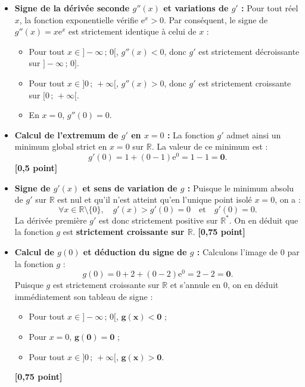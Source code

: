 \documentclass[11pt,a4paper]{article}
\newcommand{\R}{\mathbb{R}}
\newcommand{\e}{\mathrm{e}}
\begin{document}
\begin{correctionbox}
\begin{itemize}[leftmargin=*]
    \item \textbf{Signe de la dérivée seconde $g''(x)$ et variations de $g'$ :}
    Pour tout réel $x$, la fonction exponentielle vérifie $\e^x > 0$.
    Par conséquent, le signe de $g''(x) = x\e^x$ est strictement identique à celui de $x$ :
    \begin{itemize}
        \item Pour tout $x \in ]-\infty\,;\,0[$, $g''(x) < 0$, donc $g'$ est strictement décroissante sur $]-\infty\,;\,0]$.
        \item Pour tout $x \in ]0\,;\,+\infty[$, $g''(x) > 0$, donc $g'$ est strictement croissante sur $[0\,;\,+\infty[$.
        \item En $x = 0$, $g''(0) = 0$.
    \end{itemize}
    \item \textbf{Calcul de l'extremum de $g'$ en $x = 0$ :}
    La fonction $g'$ admet ainsi un minimum global strict en $x = 0$ sur $\R$. La valeur de ce minimum est :
    \[
    g'(0) = 1 + (0 - 1)\e^0 = 1 - 1 = \mathbf{0}.
    \] \hfill \textbf{[0{,}5 point]}
    \item \textbf{Signe de $g'(x)$ et sens de variation de $g$ :}
    Puisque le minimum absolu de $g'$ sur $\R$ est nul et qu'il n'est atteint qu'en l'unique point isolé $x = 0$, on a :
    \[
    \forall x \in \R \setminus \{0\}, \quad g'(x) > g'(0) = 0 \quad \text{et} \quad g'(0) = 0.
    \]
    La dérivée première $g'$ est donc strictement positive sur $\R^*$.
    On en déduit que la fonction $g$ est \textbf{strictement croissante sur $\R$}. \hfill \textbf{[0{,}75 point]}
    \item \textbf{Calcul de $g(0)$ et déduction du signe de $g$ :}
    Calculons l'image de $0$ par la fonction $g$ :
    \[
    g(0) = 0 + 2 + (0 - 2)\e^0 = 2 - 2 = \mathbf{0}.
    \]
    Puisque $g$ est strictement croissante sur $\R$ et s'annule en $0$, on en déduit immédiatement son tableau de signe :
    \begin{itemize}
        \item Pour tout $x \in ]-\infty\,;\,0[$, $\mathbf{g(x) < 0}$ ;
        \item Pour $x = 0$, $\mathbf{g(0) = 0}$ ;
        \item Pour tout $x \in ]0\,;\,+\infty[$, $\mathbf{g(x) > 0}$.
    \end{itemize} \hfill \textbf{[0{,}75 point]}
\end{itemize}


\end{correctionbox}
\end{document}
